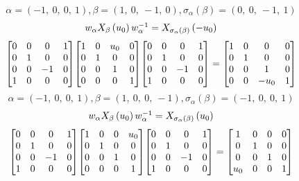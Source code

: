 \documentclass[11pt]{article}
\theoremstyle{definition}
\begin{document}
\[
\alpha = \left( -1, \  0, \  0, \  1\right), \beta = \left( 1, \  0, \  -1, \  0\right), \sigma_{\alpha}(\beta) = \left( 0, \  0, \  -1, \  1\right)
\]
\[
\scaletoalign{\textwidth}{w_{\alpha} X_{\beta}\left(u_{0}\right) w_{\alpha}^{-1} = X_{\sigma_{\alpha}\left(\beta\right)}\left(- u_{0}\right)}
\]
\[
\scaletoalign{\textwidth}{{\left[\begin{matrix}0 & 0 & 0 & 1\\0 & 1 & 0 & 0\\0 & 0 & -1 & 0\\1 & 0 & 0 & 0\end{matrix}\right]} {\left[\begin{matrix}1 & 0 & u_{0} & 0\\0 & 1 & 0 & 0\\0 & 0 & 1 & 0\\0 & 0 & 0 & 1\end{matrix}\right]} {\left[\begin{matrix}0 & 0 & 0 & 1\\0 & 1 & 0 & 0\\0 & 0 & -1 & 0\\1 & 0 & 0 & 0\end{matrix}\right]} = {\left[\begin{matrix}1 & 0 & 0 & 0\\0 & 1 & 0 & 0\\0 & 0 & 1 & 0\\0 & 0 & - u_{0} & 1\end{matrix}\right]}}
\]
\[
\alpha = \left( -1, \  0, \  0, \  1\right), \beta = \left( 1, \  0, \  0, \  -1\right), \sigma_{\alpha}(\beta) = \left( -1, \  0, \  0, \  1\right)
\]
\[
\scaletoalign{\textwidth}{w_{\alpha} X_{\beta}\left(u_{0}\right) w_{\alpha}^{-1} = X_{\sigma_{\alpha}\left(\beta\right)}\left(u_{0}\right)}
\]
\[
\scaletoalign{\textwidth}{{\left[\begin{matrix}0 & 0 & 0 & 1\\0 & 1 & 0 & 0\\0 & 0 & -1 & 0\\1 & 0 & 0 & 0\end{matrix}\right]} {\left[\begin{matrix}1 & 0 & 0 & u_{0}\\0 & 1 & 0 & 0\\0 & 0 & 1 & 0\\0 & 0 & 0 & 1\end{matrix}\right]} {\left[\begin{matrix}0 & 0 & 0 & 1\\0 & 1 & 0 & 0\\0 & 0 & -1 & 0\\1 & 0 & 0 & 0\end{matrix}\right]} = {\left[\begin{matrix}1 & 0 & 0 & 0\\0 & 1 & 0 & 0\\0 & 0 & 1 & 0\\u_{0} & 0 & 0 & 1\end{matrix}\right]}}
\]
\end{document}
